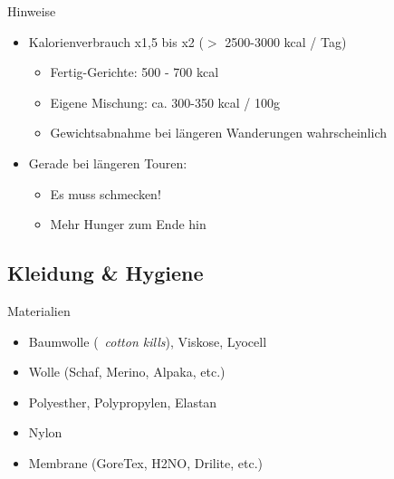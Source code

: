 \documentclass[aspectratio=169]{beamer}
\begin{document}
			\begin{frame}{Hinweise}
				\begin{itemize}
					\item Kalorienverbrauch x1,5 bis x2 ($>$ 2500-3000 kcal / Tag)
					\begin{itemize}
						\item Fertig-Gerichte: 500 - 700 kcal\pause
						\item Eigene Mischung: ca. 300-350 kcal / 100g
						\item Gewichtsabnahme bei längeren Wanderungen wahrscheinlich
					\end{itemize}\pause
					\item Gerade bei längeren Touren: 
					\begin{itemize}
						\item Es muss schmecken!
						\item Mehr Hunger zum Ende hin
					\end{itemize}
				\end{itemize}
			\end{frame}
			
		\subsection{Kleidung \& Hygiene}
			
			\begin{frame}{Materialien}
				\begin{itemize}
					\item Baumwolle (\textrightarrow\ \textit{cotton kills}), Viskose, Lyocell
					\item Wolle (Schaf, Merino, Alpaka, etc.)
					\item Polyesther, Polypropylen, Elastan
					\item Nylon
					\item Membrane (GoreTex, H2NO, Drilite, etc.)
				\end{itemize}
			\end{frame}
			
			
\end{document}
